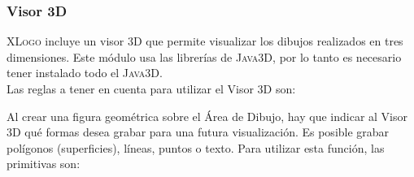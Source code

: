 \subsubsection{Visor 3D} 

\textsc{XLogo} incluye un visor 3D que permite visualizar los dibujos realizados
en tres dimensiones. Este m\'odulo usa las librer\'ias de \textsc{Java3D}, por lo
tanto es necesario tener instalado todo el \textsc{Java3D}. \\

\noindent Las reglas a tener en cuenta para utilizar el Visor 3D son:

Al crear una figura geom\'etrica sobre el \'Area de Dibujo, hay que indicar al
Visor 3D qu\'e formas desea grabar para una futura visualizaci\'on. Es posible
grabar pol\'igonos (superficies), l\'ineas, puntos o texto. Para utilizar esta
funci\'on, las primitivas son:
